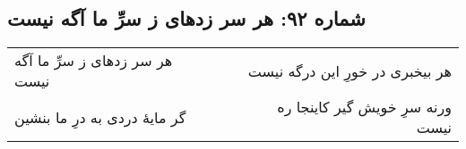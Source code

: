 \begin{center}
\section*{شماره ۹۲: هر سر زدهای ز سرِّ ما آگه نیست}
\label{sec:092}
\begin{longtable}{l p{0.5cm} r}
هر سر زدهای ز سرِّ ما آگه نیست
&&
هر بیخبری در خورِ این درگه نیست
\\
گر مایهٔ دردی به درِ ما بنشین
&&
ورنه سرِ خویش گیر کاینجا ره نیست
\\
\end{longtable}
\end{center}
